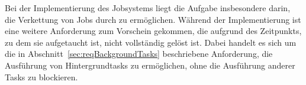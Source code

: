 Bei der Implementierung des Jobsystems liegt die Aufgabe insbesondere darin, die Verkettung von Jobs durch  zu ermöglichen. Während der Implementierung ist eine weitere Anforderung zum Vorschein gekommen, die aufgrund des Zeitpunkts, zu dem sie aufgetaucht ist, nicht vollständig gelöst ist. Dabei handelt es sich um die in Abschnitt~\ref{sec:reqBackgroundTasks} beschriebene Anforderung, die Ausführung von Hintergrundtasks zu ermöglichen, ohne die Ausführung anderer Tasks zu blockieren. 